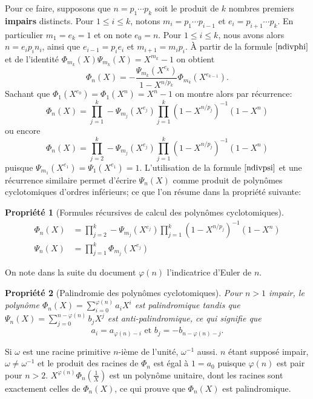 \documentclass{article}
\theoremstyle{break}                  %
\newtheorem{propriete}{Propriété}
\begin{document}
Pour ce faire, supposons que $n = p_1 \cdots p_k$ soit le produit de $k$ nombres premiers \textbf{impairs} distincts. Pour $1 \le i \le k$, notons $m_i = p_1 \cdots p_{i-1}$ et $e_i = p_{i+1} \cdots p_{k}$. En particulier $m_1=e_k=1$ et on note $e_0 = n$. Pour $1 \le i \le k$, nous avons alors $n = e_i p_i n_i$, ainsi que $e_{i-1}=p_i e_i$ et $m_{i+1}=m_i p_i$. À partir de la formule $\ref{ndivphi}$ et de l'identité $\Phi_{m_k}(X) \Psi_{m_k}(X) = X^{m_k}-1$ on obtient
$$\Phi_{n}(X) = - \frac{\Psi_{m_k}(X^{e_k})}{1- X^{n/p_k}} \Phi_{m_k}(X^{e_{k-1}}).$$
Sachant que $\Phi_1(X^{e_0}) = \Phi_1(X^n) = X^n-1$ on montre alors par récurrence:
$$\Phi_n(X)=\prod_{j=1}^{k} - \Psi_{m_j}(X^{e_j}) \prod_{j=1}^{k} (1-X^{n/p_j})^{-1}(1-X^n)$$
ou encore $$\Phi_n(X)=\prod_{j=2}^{k} - \Psi_{m_j}(X^{e_j}) \prod_{j=1}^{k} (1-X^{n/p_j})^{-1}(1-X^n)$$
puisque $\Psi_{m_1}(X^{e_1}) = \Psi_{1}(X^{e_1}) =1$. L'utilisation de la formule $\ref{ndivpsi}$ et une récurrence similaire permet d'écrire $\Psi_n(X)$ comme produit de polynômes cyclotomiques d'ordres inférieurs; ce que l'on résume dans la propriété suivante:


\begin{propriete}[Formules récursives de calcul des polynômes cyclotomiques]
	\begin{align*}
		\Phi_n(X) &=\prod_{j=2}^{k} - \Psi_{m_j}(X^{e_j}) \prod_{j=1}^{k} (1-X^{n/p_j})^{-1}(1-X^n)\tag{3.17}\label{recurphi}\\
		\Psi_{n}(X) &=\prod_{j=1}^{k} \Phi_{m_j}(X^{e_j})\tag{3.25}\label{recurpsi}
	\end{align*}
\end{propriete}

On note dans la suite du document $\varphi(n)$ l'indicatrice d'Euler de $n$.

\begin{propriete}[Palindromie des polynômes cyclotomiques]
	Pour $n > 1$ impair, le polynôme $\Phi_n(X) = \sum_{i=0}^{\varphi(n)} a_i X^i$ est palindromique tandis que $\Psi_n(X) = \sum_{j=0}^{n-\varphi(n)} b_j X^j$ est anti-palindromique, ce qui signifie que
	$$a_i=a_{\varphi(n)-i} \text{ et } b_j=-b_{n-\varphi(n)-j}.$$
\end{propriete}
Si $\omega$ est une racine primitive $n$-ième de l'unité, $\omega^{-1}$ aussi. $n$ étant supposé impair, $\omega \neq \omega^{-1}$ et le produit des racines de $\Phi_{n}$ est égal à $1 = a_0$ puisque $\varphi(n)$ est pair pour $n > 2$. $X^{\varphi(n)} \Phi_n(\frac{1}{X})$ est un polynôme unitaire, dont les racines sont exactement celles de $\Phi_n(X)$, ce qui prouve que $\Phi_n(X)$ est palindromique.\\
\end{document}
